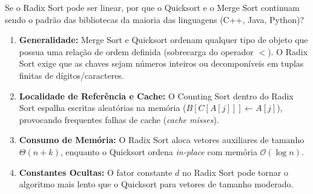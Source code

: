 \documentclass[11pt,a4paper]{article}
\begin{document}
\begin{dica}
Se o Radix Sort pode ser linear, por que o Quicksort e o Merge Sort continuam sendo o padrão das bibliotecas da maioria das linguagens (C++, Java, Python)?
\begin{enumerate}
    \item \textbf{Generalidade:} Merge Sort e Quicksort ordenam qualquer tipo de objeto que possua uma relação de ordem definida (sobrecarga do operador $<$). O Radix Sort exige que as chaves sejam números inteiros ou decomponíveis em tuplas finitas de dígitos/caracteres.
    \item \textbf{Localidade de Referência e Cache:} O Counting Sort dentro do Radix Sort espalha escritas aleatórias na memória ($B[C[A[j]]] \leftarrow A[j]$), provocando frequentes falhas de cache (\emph{cache misses}).
    \item \textbf{Consumo de Memória:} O Radix Sort aloca vetores auxiliares de tamanho $\Theta(n + k)$, enquanto o Quicksort ordena \emph{in-place} com memória $\mathcal{O}(\log n)$.
    \item \textbf{Constantes Ocultas:} O fator constante $d$ no Radix Sort pode tornar o algoritmo mais lento que o Quicksort para vetores de tamanho moderado.
\end{enumerate}
\end{dica}
\end{document}

